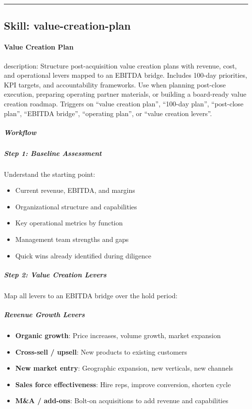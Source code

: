 \documentclass[11pt]{article}
\begin{document}
\vspace{0.8em}\hrule\vspace{0.8em}

\subsection{Skill: value-creation-plan}\label{file:skills-value-creation-plan-SKILL.md}

\paragraph{Value Creation Plan}\mbox{}\par

description: Structure post-acquisition value creation plans with revenue, cost, and operational levers mapped to an EBITDA bridge. Includes 100-day priorities, KPI targets, and accountability frameworks. Use when planning post-close execution, preparing operating partner materials, or building a board-ready value creation roadmap. Triggers on ``value creation plan'', ``100-day plan'', ``post-close plan'', ``EBITDA bridge'', ``operating plan'', or ``value creation levers''.


\subparagraph{Workflow}\mbox{}\par

\subparagraph{Step 1: Baseline Assessment}\mbox{}\par

Understand the starting point:

\begin{itemize}[leftmargin=*,itemsep=2pt,topsep=2pt]
\item {} Current revenue, EBITDA, and margins
\item {} Organizational structure and capabilities
\item {} Key operational metrics by function
\item {} Management team strengths and gaps
\item {} Quick wins already identified during diligence
\end{itemize}

\subparagraph{Step 2: Value Creation Levers}\mbox{}\par

Map all levers to an EBITDA bridge over the hold period:


\subparagraph{Revenue Growth Levers}\mbox{}\par
\begin{itemize}[leftmargin=*,itemsep=2pt,topsep=2pt]
\item {} \textbf{Organic growth}: Price increases, volume growth, market expansion
\item {} \textbf{Cross-sell / upsell}: New products to existing customers
\item {} \textbf{New market entry}: Geographic expansion, new verticals, new channels
\item {} \textbf{Sales force effectiveness}: Hire reps, improve conversion, shorten cycle
\item {} \textbf{M\&A / add-ons}: Bolt-on acquisitions to add revenue and capabilities
\end{itemize}
\end{document}
